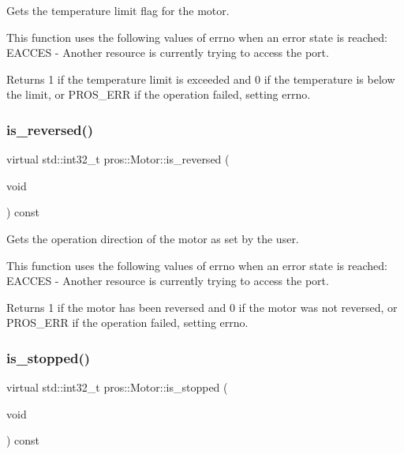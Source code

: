Gets the temperature limit flag for the motor. 

This function uses the following values of errno when an error state is reached\+: E\+A\+C\+C\+ES -\/ Another resource is currently trying to access the port.

\begin{DoxyReturn}{Returns}
1 if the temperature limit is exceeded and 0 if the temperature is below the limit, or P\+R\+O\+S\+\_\+\+E\+RR if the operation failed, setting errno. 
\end{DoxyReturn}
\mbox{\label{classpros_1_1Motor_a5122faa60ef7745761eca847192560c5}} 
\subsubsection{\texorpdfstring{is\_reversed()}{is\_reversed()}}
{\footnotesize\ttfamily virtual std\+::int32\+\_\+t pros\+::\+Motor\+::is\+\_\+reversed (\begin{DoxyParamCaption}\item[{void}]{ }\end{DoxyParamCaption}) const\hspace{0.3cm}{\ttfamily [virtual]}}



Gets the operation direction of the motor as set by the user. 

This function uses the following values of errno when an error state is reached\+: E\+A\+C\+C\+ES -\/ Another resource is currently trying to access the port.

\begin{DoxyReturn}{Returns}
1 if the motor has been reversed and 0 if the motor was not reversed, or P\+R\+O\+S\+\_\+\+E\+RR if the operation failed, setting errno. 
\end{DoxyReturn}
\mbox{\label{classpros_1_1Motor_a884c19ae71a6c9f0b316520f09769be9}} 
\subsubsection{\texorpdfstring{is\_stopped()}{is\_stopped()}}
{\footnotesize\ttfamily virtual std\+::int32\+\_\+t pros\+::\+Motor\+::is\+\_\+stopped (\begin{DoxyParamCaption}\item[{void}]{ }\end{DoxyParamCaption}) const\hspace{0.3cm}{\ttfamily [virtual]}}



